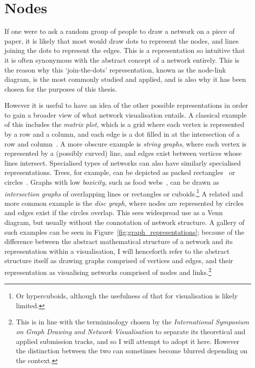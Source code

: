 \chapter{Nodes}
If one were to ask a random group of people to draw a network on a piece of paper, it is likely that most would draw dots to represent the nodes, and lines joining the dots to represent the edges. This is a representation so intuitive that it is often synonymous with the abstract concept of a network entirely.
This is the reason why this `join-the-dots' representation, known as the node-link diagram, is the most commonly studied and applied, and is also why it has been chosen for the purposes of this thesis.

However it is useful to have an idea of the other possible representations in order to gain a broader view of what network visualisation entails. A classical example of this includes the \emph{matrix plot}, which is a grid where each vertex is represented by a row and a column, and each edge is a dot filled in at the intersection of a row and column~\cite{Liiv2010}.
A more obscure example is \emph{string graphs}, where each vertex is represented by a (possibly curved) line, and edges exist between vertices whose lines intersect.
Specialised types of networks can also have similarly specialised representations. Trees, for example, can be depicted as packed rectangles~\cite{Johnson1991} or circles~\cite{Wang2006}.
Graphs with low \emph{boxicity}, such as food webs~\cite{Eklof2013}, can be drawn as \emph{intersection graphs} of overlapping lines or rectangles or cuboids.\footnote{Or hypercuboids, although the usefulness of that for visualisation is likely limited.}
A related and more common example is the \emph{disc graph}, where nodes are represented by circles and edges exist if the circles overlap. This sees widespread use as a Venn diagram, but usually without the connotation of network structure.
A gallery of such examples can be seen in Figure~\ref{fig:graph_representations}; because of the difference between the abstract mathematical structure of a network and its representation within a visualisation, I will henceforth refer to the abstract structure itself as drawing graphs comprised of vertices and edges, and their representation as visualising networks comprised of nodes and links.\footnote{This is in line with the termininology chosen by the \emph{International Symposium on Graph Drawing and Network Visualisation} to separate its theoretical and applied submission tracks, and so I will attempt to adopt it here. However the distinction between the two can sometimes become blurred depending on the context.}

